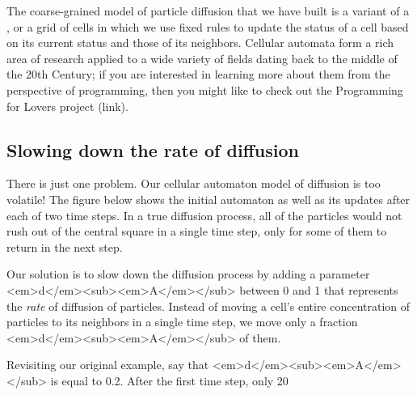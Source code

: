 {The coarse-grained model of particle diffusion that we have built is a variant of a , or a grid of cells in which we use fixed rules to update the status of a cell based on its current status and those of its neighbors. Cellular automata form a rich area of research applied to a wide variety of fields dating back to the middle of the 20th Century; if you are interested in learning more about them from the perspective of programming, then you might like to check out the Programming for Lovers project (link).

\FloatBarrier
{}
\subsection{Slowing down the rate of diffusion}

There is just one problem. Our cellular automaton model of diffusion is too volatile! The figure below shows the initial automaton as well as its updates after each of two time steps. In a true diffusion process, all of the particles would not rush out of the central square in a single time step, only for some of them to return in the next step.

{%

Our solution is to slow down the diffusion process by adding a parameter <em>d</em><sub><em>A</em></sub> between 0 and 1 that represents the \textit{rate} of diffusion of  particles. Instead of moving a cell's entire concentration of particles to its neighbors in a single time step, we move only a fraction <em>d</em><sub><em>A</em></sub> of them.

Revisiting our original example, say that <em>d</em><sub><em>A</em></sub> is equal to 0.2. After the first time step, only 20%

}}
